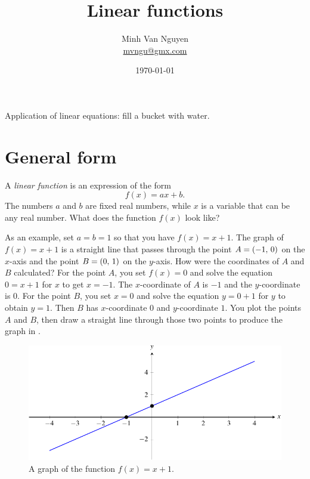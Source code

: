 \documentclass[a4paper,oneside,12pt]{article}
\begin{document}
\title{\Large\bf Linear functions}
\author{%
  Minh Van Nguyen \\
  \url{mvngu@gmx.com}
}
\date{\today}
\maketitle

\begin{packeditem}
\item Application of linear equations: fill a bucket with water.
\end{packeditem}


\section{General form}
\label{sec:general_form}

A \emph{linear function} is an expression of the form
\begin{equation}
\label{eqn:linear_function_general}
f(x)
=
ax + b.
\end{equation}
The numbers $a$ and $b$ are fixed real numbers, while $x$ is a
variable that can be any real number.  What does the function $f(x)$
look like?

As an example, set $a = b = 1$ so that you have $f(x) = x + 1$.  The
graph of $f(x) = x + 1$ is a straight line that passes through the
point $A = \left\lparen{-1},\, {0}\right\rparen$ on the $x$-axis and the point
$B = \left\lparen{0},\, {1}\right\rparen$ on the $y$-axis.  How were the coordinates of $A$
and $B$ calculated?  For the point $A$, you set $f(x) = 0$ and solve
the equation $0 = x + 1$ for $x$ to get $x = -1$.  The $x$-coordinate
of $A$ is $-1$ and the $y$-coordinate is $0$.  For the point $B$,
you set $x = 0$ and solve the equation $y = 0 + 1$ for $y$ to obtain
$y = 1$.  Then $B$ has $x$-coordinate $0$ and $y$-coordinate $1$.  You
plot the points $A$ and $B$, then draw a straight line through those
two points to produce the graph in .

\begin{figure}[!htbp]
\centering
\includegraphics[scale=1]{image/06/a-1-b-1.pdf}
\caption{%
  A graph of the function $f(x) = x + 1$.
}
\label{fig:plot_x_+_1}
\end{figure}
\end{document}
